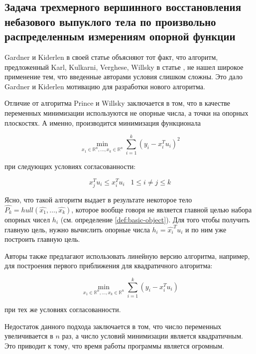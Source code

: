 \documentclass[a4paper, 12pt, titlepage]{article}
\theoremstyle{definition}
\theoremstyle{plain}
\theoremstyle{plain}
\begin{document}
\newpage
\subsection{Задача трехмерного вершинного восстановления небазового выпуклого
тела по произвольно распределенным измерениям опорной функции}

Gardner и Kiderlen в своей статье \cite{journals/pami/GardnerK09} объясняют
тот факт, что алгоритм, предложенный Karl, Kulkarni, Verghese, Willsky в статье
\cite{journals/jmiv/KarlKVW96}, не нашел широкое применение тем, что
введенные авторами условия слишком сложны. Это дало Gardner и Kiderlen
мотивацию для разработки нового алгоритма.

Отличие от алгоритма Prince и Willsky заключается в том, что в качестве
переменных минимизации используются не опорные числа, а точки на опорных
плоскостях. А именно, производится минимизация функционала

\begin{equation}
 \min_{x_{1} \in \mathbb{R}^{n}, \ldots, x_{k} \in \mathbb{R}^{n}}
 \sum \limits_{i = 1}^{k} (y_{i} - x_{i}^{T} u_{i})^{2}
\end{equation}

при следующих условиях согласованности:

\begin{equation}
 x_{j}^{T} u_{i} \leq x_{i}^{T} u_{i} \;\;\; 1 \leq i \neq j \leq k
\end{equation}

Ясно, что такой алгоритм выдает в результате некоторое тело
$\widehat{P_{k}} = hull(\widehat{x_{1}}, \ldots, \widehat{x_{k}})$, которое
вообще говоря не является главной целью набора опорных чисел $h_{i}$ (см.
определение \ref{def:basic-object}). Для того чтобы получить главную цель,
нужно вычислить опорные числа $h_{i} = \widehat{x_{i}}^{T} u_{i}$ и по ним уже
построить главную цель.

Авторы также предлагают использовать линейную версию алгоритма, например, для
построения первого приближения для квадратичного алгоритма:

\begin{equation}
 \min_{x_{1} \in \mathbb{R}^{n}, \ldots, x_{k} \in \mathbb{R}^{n}}
 \sum \limits_{i = 1}^{k} (y_{i} - x_{i}^{T} u_{i})
\end{equation}

при тех же условиях согласованности.

Недостаток данного подхода заключается в том, что число переменных
увеличивается в $n$ раз, а число условий минимизации является квадратичным. Это
приводит к тому, что время работы программы является огромным.
\end{document}
